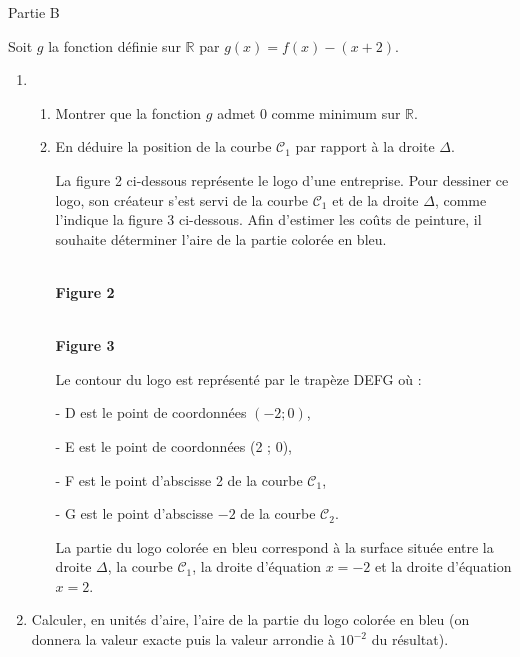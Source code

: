 \begin{h3}Partie B\end{h3}
Soit $g$ la fonction définie sur $\mathbb{R}$ par $g\left(x\right)=f\left(x\right)-\left(x+2\right)$.
\begin{enumerate}
     \item
     \begin{enumerate}
          \item
          Montrer que la fonction $g$ admet $0$ comme minimum sur $\mathbb{R}$.
          \item
          En déduire la position de la courbe $\mathscr C_{1}$ par rapport à la droite $\Delta $.
          \par
          La figure 2 ci-dessous représente le logo d'une entreprise. Pour dessiner ce logo, son créateur s'est servi de la courbe $\mathscr C_{1}$ et de la droite $\Delta $, comme l'indique la figure 3 ci-dessous. Afin d'estimer les coûts de peinture, il souhaite déterminer l'aire de la partie colorée en bleu.

\begin{center}
\\ \textbf{Figure 2}
\end{center}
\medskip
\begin{center}
\\ \textbf{Figure 3}
\end{center}

          Le contour du logo est représenté par le trapèze DEFG où :
          \par
          - D est le point de coordonnées $\left(-2 ; 0\right)$,
          \par
          - E est le point de coordonnées (2 ; 0),
          \par
          - F est le point d'abscisse 2 de la courbe $\mathscr C_{1}$,
          \par
          - G est le point d'abscisse $-2$ de la courbe $\mathscr C_{2}$.
          \par
     La partie du logo colorée en bleu correspond à la surface située entre la droite $\Delta $, la courbe $\mathscr C_{1}$, la droite d'équation $x =-2$ et la droite d'équation $x=2$.\end{enumerate}
     \item
Calculer, en unités d'aire, l'aire de la partie du logo colorée en bleu (on donnera la valeur exacte puis la valeur arrondie à $10^{-2}$ du résultat).\end{enumerate}
